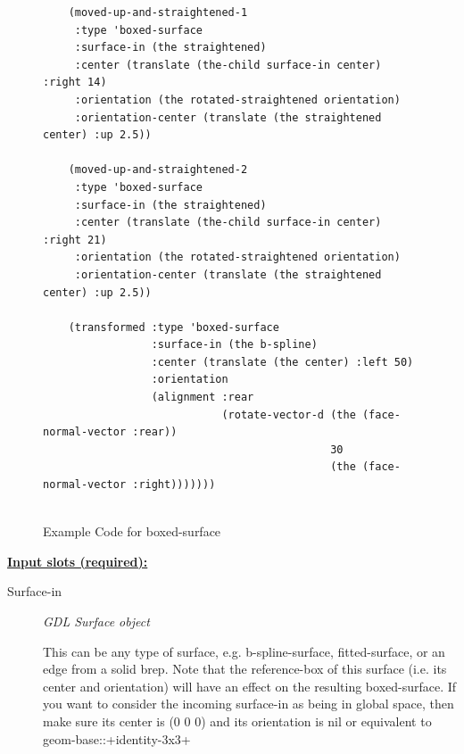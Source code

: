 \documentclass [11pt]{book}
\begin{document}
\begin{itemize}
\begin{figure}
\begin{lrbox}{\boxedverb}
\begin{minipage}{\linewidth}
{\begin{verbatim}
    (moved-up-and-straightened-1
     :type 'boxed-surface
     :surface-in (the straightened)
     :center (translate (the-child surface-in center) :right 14)
     :orientation (the rotated-straightened orientation)
     :orientation-center (translate (the straightened center) :up 2.5))
    
    (moved-up-and-straightened-2 
     :type 'boxed-surface
     :surface-in (the straightened)
     :center (translate (the-child surface-in center) :right 21)
     :orientation (the rotated-straightened orientation)
     :orientation-center (translate (the straightened center) :up 2.5))
    
    (transformed :type 'boxed-surface
                 :surface-in (the b-spline)
                 :center (translate (the center) :left 50)
                 :orientation 
                 (alignment :rear 
                            (rotate-vector-d (the (face-normal-vector :rear))
                                             30
                                             (the (face-normal-vector :right)))))))
 
\end{verbatim}}
\end{minipage}
\end{lrbox}
\fbox{\usebox{\boxedverb}}

\caption{Example Code for boxed-surface}

\label{fig:example-code-boxed-surface}

\end{figure}





\textbf{
\underline{Input slots (required):}}

\begin{description}

\item [Surface-in]
\emph{GDL Surface object}

 This can be any type of surface, e.g. b-spline-surface, fitted-surface, or an edge from a solid brep.
Note that the reference-box of this surface (i.e. its center and orientation) will have an effect on the resulting
boxed-surface. If you want to consider the incoming surface-in as being in global space, then make sure its center
is (0 0 0) and its orientation is nil or equivalent to geom-base::+identity-3x3+




\end{description}







\end{itemize}
\end{document}
